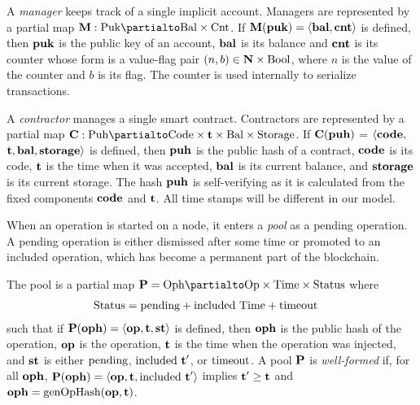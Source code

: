 \documentclass[runningheads]{llncs}
\begin{document}
A \emph{manager} keeps track of a single implicit account. Managers are
represented by a partial map $\MANAGERS : \TPUK \partialto \TBAL
\times \TCOU$. If $\textbf{M} (\textbf{puk}) = \langle\textbf{bal}, \textbf{cnt}\rangle$ is defined, then  $\textbf{puk}$ is the
public key of an account, $\textbf{bal}$ is its
balance and $\textbf{cnt}$ is its counter whose form is a value-flag pair
$(n,b) \in \textbf{N}\times\text{Bool}$, where $n$ is the value of the counter
and ${b}$ is its flag.   The counter is used internally to serialize transactions.

A \emph{contractor} manages a single smart contract. Contractors are
represented by a partial map $\CONTRACTORS : \TPUH \partialto
\TCODE \times \TIME  \times \TBAL \times  \TSTORAGE$. If $\textbf{C} (\textbf{puh})$ = $\langle
\textbf{code},$ $\textbf{t}, \textbf{bal}, \textbf{storage} \rangle $ is defined, then $\textbf{puh}$ is the
public hash of a contract,
$\textbf{code}$ is its  code,
$\textbf{t}$ is the time when it was accepted,
$\textbf{bal}$ is its current balance,
and $\textbf{storage}$ is its current storage. The hash $\textbf{puh}$ is
self-verifying as it is calculated from the fixed components $\textbf{code}$
and $\textbf{t}$. All time stamps will be different in our model.

When an operation is started on a node, it enters a \emph{pool} as a
pending operation. A pending operation is either dismissed after some time or
promoted to an included operation, which has become a permanent part
of the blockchain.

The pool is a partial map $  \PENDING= \TOPH \partialto
\TOP\times \TTIME \times \TSTATUS$ where
\begin{align*}
  \text{Status}&= \text{pending} + \text{included}\ \text{Time} + \text{timeout}
\end{align*}
such that
if $\textbf{P}(\textbf{oph}) = \langle  \textbf{op}, \textbf{t}, \textbf{st}
\rangle $ is defined, then $\textbf{oph}$ is the public hash of the operation, $\textbf{op}$ is the operation, $\textbf{t}$ is the time when the
operation was injected, and $\textbf{st}$ is either $\text{pending}$,
$\text{included}\ \textbf{t}'$, or $\text{timeout}$.
A pool $\textbf{P}$ is \emph{well-formed} if, for all $\textbf{oph}$, $\textbf{P} (\textbf{oph}) =
\langle\textbf{op},\textbf{t}, \text{included}\ \textbf{t}'\rangle$ implies $\textbf{t}' \ge
\textbf{t}$ and $\textbf{oph} = \textup{genOpHash} (\textbf{op}, \textbf{t})$.
\end{document}
